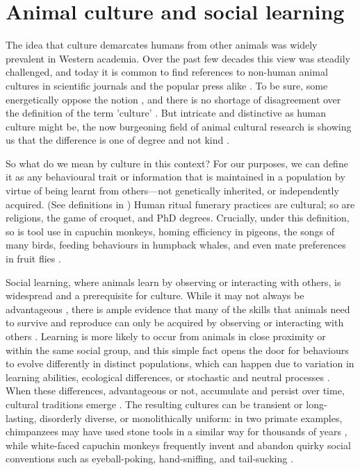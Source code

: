 
\section{Animal culture and social learning }
The idea that culture demarcates humans from other animals was widely prevalent in Western academia. Over the past few decades this view was steadily challenged, and today it is common to find references to non-human animal cultures in scientific journals and the popular press alike \autocite{whiten2019}. To be sure, some energetically oppose the notion \parencite{galef1992, sahlins1976, laland2006}, and there is no shortage of disagreement over the definition of the term 'culture’ \autocite{heyes2020,kroeber1952,laland2003}. But intricate and distinctive as human culture might be, the now burgeoning field of animal cultural research is showing us that the difference is one of degree and not kind \autocite{whiten2017a}.

So what do we mean by culture in this context? For our purposes, we can define it as any behavioural trait or information that is maintained in a population by virtue of being learnt from others---not genetically inherited, or independently acquired. (See definitions in \cite{whiten2017a, laland2003}) Human ritual funerary practices are cultural; so are religions, the game of croquet, and PhD degrees. Crucially, under this definition, so is tool use in capuchin monkeys, homing efficiency in pigeons, the songs of many birds, feeding behaviours in humpback whales, and even mate preferences in fruit flies \autocite{allen2013,danchin2018,falotico2019,sasaki2017,slater2003a}. 

Social learning, where animals learn by observing or interacting with others, is widespread and a prerequisite for culture. While it may not always be advantageous \autocite{Giraldeau2002,henrich1998,whitehead2009}, there is ample evidence that many of the skills that animals need to survive and reproduce can only be acquired by observing or interacting with others \autocite{Galef2005}. Learning is more likely to occur from animals in close proximity or within the same social group, and this simple fact opens the door for behaviours to evolve differently in distinct populations, which can happen due to variation in learning abilities, ecological differences, or stochastic and neutral processes \autocite{aplin2016,Araya-Salas2019,mesoudi2016}. When these differences, advantageous or not, accumulate and persist over time, cultural traditions emerge \autocite{nunn2009,tchernichovski2017}. The resulting cultures can be transient or long-lasting, disorderly diverse, or monolithically uniform: in two primate examples, chimpanzees may have used stone tools in a similar way for thousands of years \autocite{carvalho2008,mercader2007}, while white-faced capuchin monkeys frequently invent and abandon quirky social conventions such as eyeball-poking, hand-sniffing, and tail-sucking \autocite{Perry2003}. 

